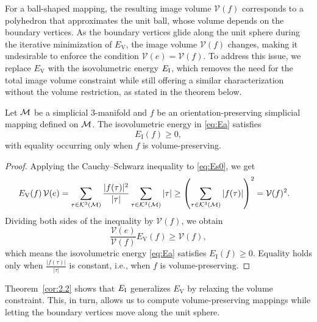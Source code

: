 \documentclass[11pt,a4paper]{article}
\def\rV{\mathrm{V}}
\begin{document}
For a ball-shaped mapping, the resulting image volume \( \mathcal{V}(f) \) corresponds to a polyhedron that approximates the unit ball, whose volume depends on the boundary vertices. As the boundary vertices glide along the unit sphere during the iterative minimization of \( E_\rV \), the image volume \( \mathcal{V}(f) \) changes, making it undesirable to enforce the condition \( \mathcal{V}(e) = \mathcal{V}(f) \). To address this issue, we replace $E_\rV$ with the isovolumetric energy $E_{\mathrm{I}}$, which removes the need for the total image volume constraint while still offering a similar characterization without the volume restriction, as stated in the theorem below.



\begin{theorem} \label{cor:2.2}
Let $\mathcal{M}$ be a simplicial $3$-manifold and $f$ be an orientation-preserving simplicial mapping defined on $\mathcal{M}$. The isovolumetric energy in \eqref{eq:Ea} satisfies
$$
E_\mathrm{I}(f) \geq 0,
$$
with equality occurring only when $f$ is volume-preserving.
\end{theorem}
\begin{proof}
Applying the Cauchy–Schwarz inequality to \eqref{eq:Es0}, we get
\begin{align*}
E_\mathrm{V}(f) \, \mathcal{V}({e}) &= \sum_{\tau\in\mathcal{K}^3(\mathcal{M})} \frac{|f(\tau)|^2}{|\tau|} 
\sum_{\tau\in\mathcal{K}^3(\mathcal{M})} |\tau|
\geq \left(\sum_{\tau\in\mathcal{K}^3(\mathcal{M})} |f(\tau)| \right)^2 = \mathcal{V}(f)^2. 
\end{align*}
Dividing both sides of the inequality by $\mathcal{V}(f)$, we obtain
$$
\frac{\mathcal{V}({e})}{\mathcal{V}(f)}E_\mathrm{V}(f) \geq \mathcal{V}(f),
$$
which means the isovolumetric energy \eqref{eq:Ea} satisfies $E_\mathrm{I}(f) \geq 0$. 
Equality holds only when $\frac{|f(\tau)|}{|\tau|}$ is constant, i.e., when $f$ is volume-preserving.
\end{proof}


Theorem~\ref{cor:2.2} shows that $E_{\mathrm{I}}$ generalizes $E_\rV$ by relaxing the volume constraint. This, in turn, allows us to compute volume-preserving mappings while letting the boundary vertices move along the unit sphere.
\end{document}
